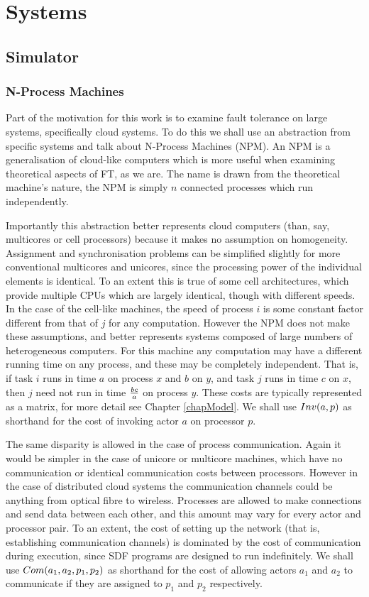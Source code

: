\chapter{Systems}
\label{chapSystems}

\section{Simulator}

\subsection{N-Process Machines}
\label{secSystemNPM}

Part of the motivation for this work is to examine fault tolerance on large systems, specifically cloud systems.
To do this we shall use an abstraction from specific systems and talk about N-Process Machines (NPM).
An NPM is a generalisation of cloud-like computers which is more useful when examining theoretical aspects of FT, as we are.
The name is drawn from the theoretical machine's nature, the NPM is simply $n$ connected processes which run independently.

Importantly this abstraction better represents cloud computers (than, say, multicores or cell processors) because it makes no assumption on homogeneity.
Assignment and synchronisation problems can be simplified slightly for more conventional multicores and unicores, since the processing power of the individual elements is identical.
To an extent this is true of some cell architectures, which provide multiple CPUs which are largely identical, though with different speeds.
In the case of the cell-like machines, the speed of process $i$ is some constant factor different from that of $j$ for any computation.
However the NPM does not make these assumptions, and better represents systems composed of large numbers of heterogeneous computers.
For this machine any computation may have a different running time on any process, and these may be completely independent.
That is, if task $i$ runs in time $a$ on process $x$ and $b$ on $y$, and task $j$ runs in time $c$ on $x$, then $j$ need not run in time ${bc}\over{a}$ on process $y$.
These costs are typically represented as a matrix, for more detail see Chapter \ref{chapModel}.
We shall use $Inv(a, p)$ as shorthand for the cost of invoking actor $a$ on processor $p$.

The same disparity is allowed in the case of process communication.
Again it would be simpler in the case of unicore or multicore machines, which have no communication or identical communication costs between processors.
However in the case of distributed cloud systems the communication channels could be anything from optical fibre to wireless.
Processes are allowed to make connections and send data between each other, and this amount may vary for every actor and processor pair.
To an extent, the cost of setting up the network (that is, establishing communication channels) is dominated by the cost of communication during execution, since SDF programs are designed to run indefinitely.
We shall use $Com(a_1, a_2, p_1, p_2)$ as shorthand for the cost of allowing actors $a_1$ and $a_2$ to communicate if they are assigned to $p_1$ and $p_2$ respectively.


